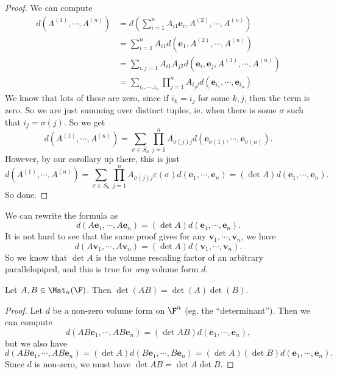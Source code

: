 \documentclass[a4paper]{article}
\begin{document}
\begin{proof}
  We can compute
  \begin{align*}
    d(A^{(1)}, \cdots, A^{(n)}) &= d\left(\sum_{i = 1}^n A_{i1} \mathbf{e}_i, A^{(2)}, \cdots, A^{(n)}\right)\\
    &= \sum_{i = 1}^n A_{i1} d(\mathbf{e}_1, A^{(2)}, \cdots, A^{(n)})\\
    &= \sum_{i, j = 1}A_{i1}A_{j2}d(\mathbf{e}_i, \mathbf{e}_j, A^{(3)}, \cdots, A^{(n)})\\
    &= \sum_{i_1, \cdots, i_n} \prod_{j = 1}^n A_{i_j j}d(\mathbf{e}_{i_1}, \cdots, \mathbf{e}_{i_n})
  \end{align*}
  We know that lots of these are zero, since if $i_k = i_j$ for some $k, j$, then the term is zero. So we are just summing over distinct tuples, ie. when there is some $\sigma$ such that $i_j = \sigma(j)$. So we get
  \[
    d(A^{(1)}, \cdots, A^{(n)}) = \sum_{\sigma \in S_n} \prod_{j = 1}^n A_{\sigma(j)j} d(\mathbf{e}_{\sigma(1)}, \cdots, \mathbf{e}_{\sigma(n)}).
  \]
  However, by our corollary up there, this is just
  \[
    d(A^{(1)}, \cdots, A^{(n)}) = \sum_{\sigma \in S_n} \prod_{j = 1}^n A_{\sigma(j)j} \varepsilon(\sigma) d(\mathbf{e}_1, \cdots, \mathbf{e}_n) = (\det A) d(\mathbf{e}_1, \cdots, \mathbf{e}_n).
  \]
  So done.
\end{proof}
We can rewrite the formula as
\[
  d (A \mathbf{e}_1, \cdots, A\mathbf{e}_n) = (\det A)d(\mathbf{e}_1, \cdots, \mathbf{e}_n).
\]
It is not hard to see that the same proof gives for any $\mathbf{v}_1, \cdots, \mathbf{v}_n$, we have
\[
  d(A\mathbf{v}_1, \cdots, A\mathbf{v}_n) = (\det A)d(\mathbf{v}_1, \cdots, \mathbf{v}_n).
\]
So we know that $\det A$ is the volume rescaling factor of an arbitrary parallelopiped, and this is true for \emph{any} volume form $d$.

\begin{thm}
  Let $A, B \in \Mat_n(\F)$. Then $\det(AB) = \det(A)\det(B)$.
\end{thm}

\begin{proof}
  Let $d$ be a non-zero volume form on $\F^n$ (eg. the ``determinant''). Then we can compute
  \[
    d(AB\mathbf{e}_1,\cdots , AB\mathbf{e}_n) = (\det AB) d(\mathbf{e}_1,\cdots, \mathbf{e}_n),
  \]
  but we also have
  \[
    d(AB\mathbf{e}_1, \cdots, AB\mathbf{e}_n) = (\det A) d(B\mathbf{e}_1, \cdots, B\mathbf{e}_n) = (\det A)(\det B)d(\mathbf{e}_1, \cdots, \mathbf{e}_n).
  \]
  Since $d$ is non-zero, we must have $\det AB = \det A \det B$.
\end{proof}
\end{document}
